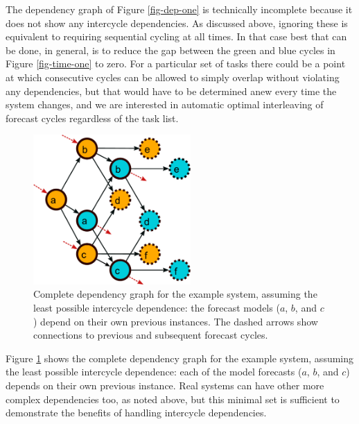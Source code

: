 \documentclass[11pt,a4paper]{article}
\begin{document}
The dependency graph of Figure \ref{fig-dep-one} is technically
incomplete because it does not show any intercycle dependencies.  As
discussed above, ignoring these is equivalent to requiring sequential
cycling at all times. In that case best that can be done, in general, is
to reduce the gap between the green and blue cycles in Figure
\ref{fig-time-one} to zero. For a particular set of tasks there could be
a point at which consecutive cycles can be allowed to simply overlap
without violating any dependencies, but that would have to be determined
anew every time the system changes, and we are interested in automatic
optimal interleaving of forecast cycles regardless of the task list.  

\begin{figure} \begin{center}
    \includegraphics[width=6cm]{dependencies-two} \end{center}
    \caption{\small Complete dependency graph for the example
    system, assuming the least possible intercycle dependence: the
    forecast models ($a$, $b$, and $c$) depend on their own previous
    instances. The dashed arrows show connections to previous and
    subsequent forecast cycles.} 
    \label{fig-dep-two}
\end{figure}

Figure \ref{fig-dep-two} shows the complete dependency graph for the
example system, assuming the least possible intercycle dependence: each
of the model forecasts ($a$, $b$, and $c$) depends on their own previous
instance. Real systems can have other more complex dependencies too, as
noted above, but this minimal set is sufficient to demonstrate the
benefits of handling intercycle dependencies.
\end{document}
